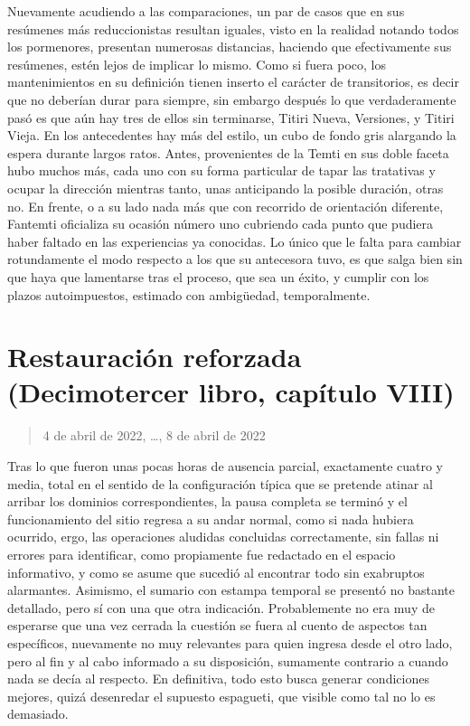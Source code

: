 \documentclass[
]{book}
\begin{document}
Nuevamente acudiendo a las comparaciones, un par de casos que en sus resúmenes más reduccionistas resultan iguales, visto en la realidad notando todos los pormenores, presentan numerosas distancias, haciendo que efectivamente sus resúmenes, estén lejos de implicar lo mismo. Como si fuera poco, los mantenimientos en su definición tienen inserto el carácter de transitorios, es decir que no deberían durar para siempre, sin embargo después lo que verdaderamente pasó es que aún hay tres de ellos sin terminarse, Titiri Nueva, Versiones, y Titiri Vieja. En los antecedentes hay más del estilo, un cubo de fondo gris alargando la espera durante largos ratos. Antes, provenientes de la Temti en sus doble faceta hubo muchos más, cada uno con su forma particular de tapar las tratativas y ocupar la dirección mientras tanto, unas anticipando la posible duración, otras no. En frente, o a su lado nada más que con recorrido de orientación diferente, Fantemti oficializa su ocasión número uno cubriendo cada punto que pudiera haber faltado en las experiencias ya conocidas. Lo único que le falta para cambiar rotundamente el modo respecto a los que su antecesora tuvo, es que salga bien sin que haya que lamentarse tras el proceso, que sea un éxito, y cumplir con los plazos autoimpuestos, estimado con ambigüedad, temporalmente.

\hypertarget{restauraciuxf3n-reforzada-decimotercer-libro-capuxedtulo-viii}{%
\section{Restauración reforzada (Decimotercer libro, capítulo VIII)}\label{restauraciuxf3n-reforzada-decimotercer-libro-capuxedtulo-viii}}

\begin{quote}
4 de abril de 2022, \ldots, 8 de abril de 2022
\end{quote}

Tras lo que fueron unas pocas horas de ausencia parcial, exactamente cuatro y media, total en el sentido de la configuración típica que se pretende atinar al arribar los dominios correspondientes, la pausa completa se terminó y el funcionamiento del sitio regresa a su andar normal, como si nada hubiera ocurrido, ergo, las operaciones aludidas concluidas correctamente, sin fallas ni errores para identificar, como propiamente fue redactado en el espacio informativo, y como se asume que sucedió al encontrar todo sin exabruptos alarmantes. Asimismo, el sumario con estampa temporal se presentó no bastante detallado, pero sí con una que otra indicación. Probablemente no era muy de esperarse que una vez cerrada la cuestión se fuera al cuento de aspectos tan específicos, nuevamente no muy relevantes para quien ingresa desde el otro lado, pero al fin y al cabo informado a su disposición, sumamente contrario a cuando nada se decía al respecto. En definitiva, todo esto busca generar condiciones mejores, quizá desenredar el supuesto espagueti, que visible como tal no lo es demasiado.
\end{document}
